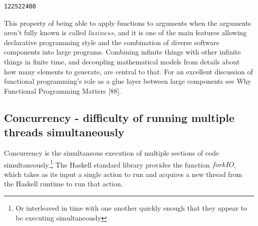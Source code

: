 \documentclass[]{article}
\newenvironment{Shaded}{}{}
\newcommand{\KeywordTok}[1]{\textcolor[rgb]{0.00,0.44,0.13}{\textbf{{#1}}}}
\newcommand{\DataTypeTok}[1]{\textcolor[rgb]{0.56,0.13,0.00}{{#1}}}
\newcommand{\DecValTok}[1]{\textcolor[rgb]{0.25,0.63,0.44}{{#1}}}
\newcommand{\CharTok}[1]{\textcolor[rgb]{0.25,0.44,0.63}{{#1}}}
\newcommand{\OtherTok}[1]{\textcolor[rgb]{0.00,0.44,0.13}{{#1}}}
\newcommand{\FunctionTok}[1]{\textcolor[rgb]{0.02,0.16,0.49}{{#1}}}
\newcommand{\NormalTok}[1]{{#1}}
\begin{document}
\begin{verbatim}
122522400
\end{verbatim}

\doublespacing

This property of being able to apply functions to arguments when the
arguments aren't fully known is called \(laziness\), and it is one of
the main features allowing declarative programming style and the
combination of diverse software components into large programs.
Combining infinite things with other infinite things in finite time, and
decoupling mathematical models from details about how many elements to
generate, are central to that. For an excellent discussion of functional
programming's role as a glue layer between large components see Why
Functional Programming Matters {[}88{]}.

\subsection{Concurrency - difficulty of running multiple threads
simultaneously}

Concurrency is the simultaneous execution of multiple sections of code
simultaneously.\footnote{Or interleaved in time with one another quickly
  enough that they appear to be executing simultaneously} The Haskell
standard library provides the function \(forkIO\), which takes as its
input a single action to run and acquires a new thread from the Haskell
runtime to run that action.

\singlespacing

\begin{Shaded}
\end{Shaded}
\end{document}

